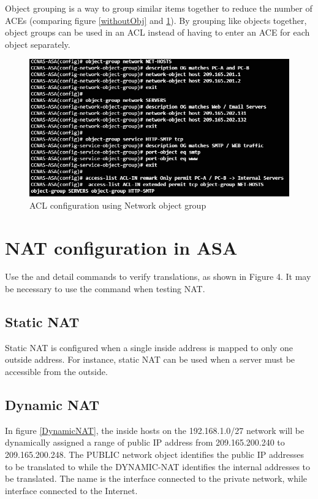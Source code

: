 Object grouping is a way to group similar items together to reduce the number of ACEs (comparing figure \ref{withoutObj} and \ref{withObj}). By grouping like objects together, object groups can be used in an ACL instead of having to enter an ACE for each object separately. 

\begin{figure}[hbtp]
\caption{ACL configuration using Network object group}\label{withObj}
\centering
\includegraphics[scale=0.7]{pictures/withObj.PNG}
\end{figure}

\section{NAT configuration in ASA}

Use the  and  detail commands to verify translations, as shown in Figure 4. It may be necessary to use the  command when testing NAT.

\subsection{Static NAT}

Static NAT is configured when a single inside address is mapped to only one outside address. For instance, static NAT can be used when a server must be accessible from the outside.

\subsection{Dynamic NAT}

In figure \ref{DynamicNAT}, the inside hosts on the 192.168.1.0/27 network will be dynamically assigned a range of public IP address from 209.165.200.240 to 209.165.200.248. The PUBLIC network object identifies the public IP addresses to be translated to while the DYNAMIC-NAT identifies the internal addresses to be translated. The name  is the interface connected to the private network, while  interface connected to the Internet.\\

